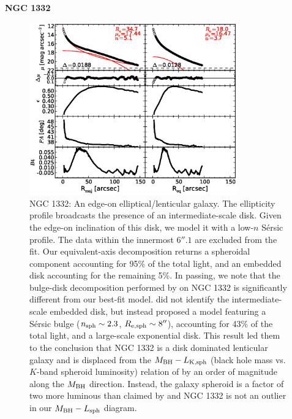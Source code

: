 \documentclass[preprint2]{emulateapj}
\newcommand{\fitfigurewidth}{0.8\textwidth}
\begin{document}
  \clearpage\newpage\noindent
  {\bf NGC 1332 \\}

  \begin{figure}[h]
  \begin{center}
  \includegraphics[width=\fitfigurewidth]{images/n1332_1Dfit.eps}
  \caption{NGC 1332: 
  An edge-on elliptical/lenticular galaxy. 
  The ellipticity profile broadcasts the presence of an intermediate-scale disk. 
  Given the edge-on inclination of this disk, we model it with a low-$n$ S\'ersic profile. 
  The data within the innermost $6''.1$ are excluded from the fit.
  Our equivalent-axis decomposition returns a spheroidal component accounting for 95\% of the total light,
  and an embedded disk accounting for the remaining 5\%.
  In passing, we note that the bulge-disk decomposition performed by \citet{rusli2011} on NGC 1332 
  is significantly different from our best-fit model.
  \citet{rusli2011} did not identify the intermediate-scale embedded disk, 
  but instead proposed a model featuring a S\'ersic bulge ($n_{\rm sph} \sim 2.3$, $R_{\rm e,sph} \sim 8''$), accounting for 43\% of the total light, 
  and a large-scale exponential disk. 
  This result led them to the conclusion that NGC 1332 is a disk dominated lenticular galaxy 
  and is displaced from the $M_{\rm BH} - L_{\rm K,sph}$ (black hole mass vs. $K$-band spheroid luminosity) relation of \citet{marconihunt2003} 
  by an order of magnitude along the $M_{\rm BH}$ direction.
  Instead, the galaxy spheroid is a factor of two more luminous than claimed by \citet{rusli2011} and  
  NGC 1332 is not an outlier in our $M_{\rm BH} - L_{\rm sph}$ diagram. \\
  }
  \end{center}
  \end{figure}
\end{document}
